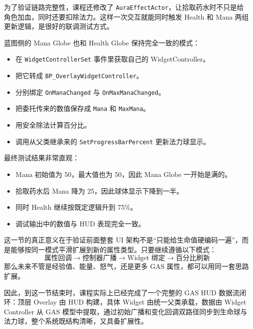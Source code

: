 为了验证链路完整性，课程还修改了 \texttt{AuraEffectActor}，让拾取药水时不只是给角色加血，同时还要扣除法力。这样一次交互就能同时触发 Health 和 Mana 两组更新逻辑，是很好的联调测试方式。

蓝图侧的 Mana Globe 也和 Health Globe 保持完全一致的模式：
\begin{itemize}
	\item 在 \texttt{WidgetControllerSet} 事件里获取自己的 WidgetController。
	\item 把它转成 \texttt{BP\_OverlayWidgetController}。
	\item 分别绑定 \texttt{OnManaChanged} 与 \texttt{OnMaxManaChanged}。
	\item 把委托传来的数值保存成 \texttt{Mana} 和 \texttt{MaxMana}。
	\item 用安全除法计算百分比。
	\item 调用从父类继承来的 \texttt{SetProgressBarPercent} 更新法力球显示。
\end{itemize}

最终测试结果非常直观：
\begin{itemize}
	\item Mana 初始值为 50，最大值也为 50，因此 Mana Globe 一开始是满的。
	\item 拾取药水后 Mana 降为 25，因此球体显示下降到一半。
	\item 同时 Health 继续按既定逻辑升到 75\%。
	\item 调试输出中的数值与 HUD 表现完全一致。
\end{itemize}

这一节的真正意义在于验证前面整套 UI 架构不是“只能给生命值硬编码一遍”，而是能够按同一模式平滑扩展到新的属性类型。只要继续遵循以下模式：
\[
\text{属性回调} \rightarrow \text{控制器广播} \rightarrow \text{Widget 绑定} \rightarrow \text{百分比刷新}
\]
那么未来不管是经验值、能量、怒气，还是更多 GAS 属性，都可以用同一套思路扩展。

因此，到这一节结束时，课程实际上已经完成了一个完整的 GAS HUD 数据流闭环：顶层 Overlay 由 HUD 构建，具体 Widget 由统一父类承载，数据由 Widget Controller 从 GAS 模型中提取，通过初始广播和变化回调双路径同步到生命球与法力球，整个系统既结构清晰，又具备扩展性。